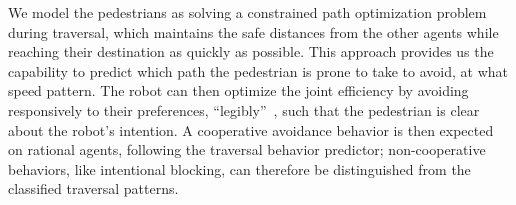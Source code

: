 \documentclass[conference]{IEEEtran}
\begin{document}

We model the pedestrians as solving a constrained path optimization 
problem during traversal, which maintains the safe distances from the other agents while reaching 
their destination as quickly as possible. This approach provides us the 
capability to predict which path the 
pedestrian is prone to take to avoid, at what speed pattern. The robot can 
then optimize the joint efficiency by avoiding responsively to their 
preferences, ``legibly''~\cite{dragan2013legibility}, such that the pedestrian 
is clear about the robot's intention. A cooperative avoidance behavior is 
then expected on rational agents, following the traversal behavior 
predictor; non-cooperative behaviors, like intentional blocking, can therefore be 
distinguished from the classified traversal patterns.


\end{document}
